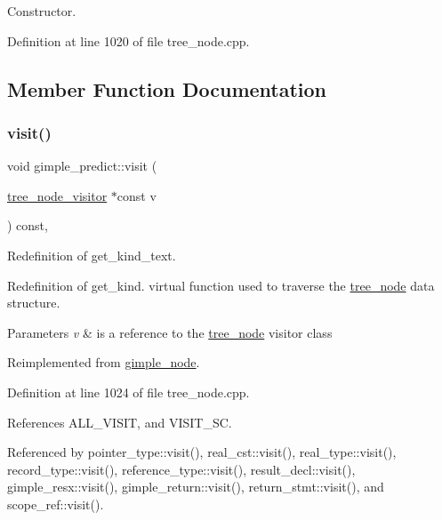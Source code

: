 Constructor. 



Definition at line 1020 of file tree\+\_\+node.\+cpp.



\subsection{Member Function Documentation}
\mbox{\label{structgimple__predict_af7e0810d1e453a5f90ceefaaa4d2c1f3}} 
\subsubsection{\texorpdfstring{visit()}{visit()}}
{\footnotesize\ttfamily void gimple\+\_\+predict\+::visit (\begin{DoxyParamCaption}\item[{\hyperlink{classtree__node__visitor}{tree\+\_\+node\+\_\+visitor} $\ast$const}]{v }\end{DoxyParamCaption}) const\hspace{0.3cm}{\ttfamily [override]}, {\ttfamily [virtual]}}



Redefinition of get\+\_\+kind\+\_\+text. 

Redefinition of get\+\_\+kind. virtual function used to traverse the \hyperlink{classtree__node}{tree\+\_\+node} data structure. 
\begin{DoxyParams}{Parameters}
{\em v} & is a reference to the \hyperlink{classtree__node}{tree\+\_\+node} visitor class \\
\hline
\end{DoxyParams}


Reimplemented from \hyperlink{structgimple__node_a337b029a3aca9c1b96311b6e6668f7f3}{gimple\+\_\+node}.



Definition at line 1024 of file tree\+\_\+node.\+cpp.



References A\+L\+L\+\_\+\+V\+I\+S\+IT, and V\+I\+S\+I\+T\+\_\+\+SC.



Referenced by pointer\+\_\+type\+::visit(), real\+\_\+cst\+::visit(), real\+\_\+type\+::visit(), record\+\_\+type\+::visit(), reference\+\_\+type\+::visit(), result\+\_\+decl\+::visit(), gimple\+\_\+resx\+::visit(), gimple\+\_\+return\+::visit(), return\+\_\+stmt\+::visit(), and scope\+\_\+ref\+::visit().

